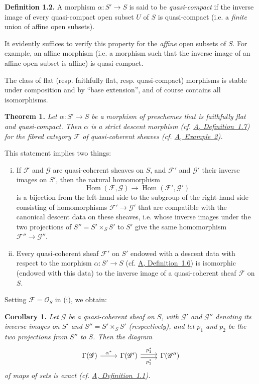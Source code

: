 \documentclass{article}
\newenvironment{itenv}[1]
  {\phantomsection\par\medskip\noindent\textbf{#1.}\itshape}
  {\par\medskip}
\newenvironment{rmenv}[1]
  {\phantomsection\par\medskip\noindent\textbf{#1.}\rmfamily}
  {\par\medskip}
\newcommand{\scr}[1]{{\mathscr{#1}}}
\renewcommand{\cal}[1]{{\mathcal{#1}}}
\DeclareMathOperator{\Hom}{Hom}
\newcommand{\oldpage}[1]{\marginpar{\footnotesize$\Big\vert$ \textit{p.~#1}}}
\begin{document}
\begin{rmenv}{Definition 1.2}
  A morphism $\alpha\colon S'\to S$ is said to be \emph{quasi-compact} if the inverse image of every quasi-compact open subset $U$ of $S$ is quasi-compact (i.e. a \emph{finite} union of affine open subsets).
\end{rmenv}

It evidently suffices to verify this property for the \emph{affine} open subsets of $S$.
For example, an affine morphism (i.e. a morphism such that the inverse image of an affine open subset is affine) is quasi-compact.

The class of flat (resp. faithfully flat, resp. quasi-compact) morphisms is stable under composition and by ``base extension'', and of course contains all isomorphisms.

\begin{itenv}{Theorem 1}
\label{theorem:B.1(1)}
  Let $\alpha\colon S'\to S$ be a morphism of preschemes that is \emph{faithfully flat} and \emph{quasi-compact}.
  Then $\alpha$ is a \emph{strict descent morphism} (cf. \hyperref[definition:A.1.7]{A, Definition~1.7}) for the fibred category $\cal{F}$ of quasi-coherent sheaves (cf. \hyperref[example:A.1.1(2)]{A, Example~2}).
\end{itenv}

This statement implies two things:
\begin{enumerate}[(i)]
  \item If $\cal{F}$ and $\scr{G}$ are quasi-coherent sheaves on $S$, and $\cal{F}'$ and $\scr{G}'$ their inverse images on $S'$, then the natural homomorphism
    \[
      \Hom(\cal{F},\scr{G}) \to \Hom(\cal{F}',\scr{G}')
    \]
    is a bijection from the left-hand side to the subgroup of the right-hand side consisting of homomorphisms $\cal{F}'\to\scr{G}'$ that are compatible with the canonical descent data on these sheaves, i.e. whose inverse images under the two projections of $S''=S'\times_S S'$ to $S'$ give the same homomorphism $\cal{F}''\to\scr{G}''$.
  \item Every quasi-coherent sheaf $\cal{F}'$ on $S'$ endowed with a descent data with respect to the morphism $\alpha\colon S'\to S$ (cf. \hyperref[definition:A.1.6]{A, Definition~1.6}) is isomorphic (endowed with this data) to the inverse image of a quasi-coherent sheaf $\cal{F}$ on $S$.
\end{enumerate}

Setting $\cal{F}=\scr{O}_S$ in (i), we obtain:

\begin{itenv}{Corollary 1}
\label{corollary:B.1(1)}
  Let $\scr{G}$ be a quasi-coherent sheaf on $S$, with $\scr{G}'$ and $\scr{G}''$ denoting its inverse images on $S'$ and $S''=S'\times_S S'$ (respectively), and let $p_1$ and $p_2$ be the two projections from $S''$ to $S$.
  Then the diagram
\oldpage{190-18}
  \[
    \begin{tikzcd}
      \Gamma(\scr{G}) \rar["\alpha^*"]
      & \Gamma(\scr{G}') \rar[shift left=1,"p_1^*"] \rar[shift right=1,swap,"p_2^*"]
      & \Gamma(\scr{G}'')
    \end{tikzcd}
  \]
  of maps of sets is \emph{exact} (cf. \hyperref[definition:A.1.1]{A, Definition~1.1}).
\end{itenv}
\end{document}
